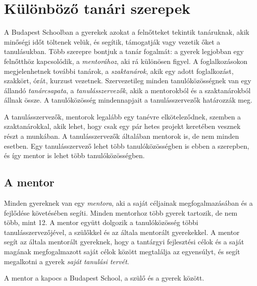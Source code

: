 \hypertarget{kulonbozo-tanari-szerepek}{%
\section{Különböző tanári szerepek}\label{kulonbozo-tanari-szerepek}}

A Budapest Schoolban a gyerekek azokat a felnőtteket tekintik
tanáruknak, akik minőségi időt töltenek velük, és segítik, támogatják
vagy vezetik őket a tanulásukban. Több szerepre bontjuk a tanár
fogalmát: a gyerek legjobban egy felnőtthöz kapcsolódik, a
\emph{mentorához}, aki rá különösen figyel. A foglalkozásokon
megjelenhetnek további tanárok, a \emph{szaktanárok}, akik egy adott
foglalkozást, szakkört, órát, kurzust vezetnek. Szervezetileg minden
tanulóközösségnek van egy állandó \emph{tanárcsapata}, a
\emph{tanulásszervezők}, akik a mentorokból és a szaktanárokból állnak
össze. A tanulóközösség mindennapjait a tanulásszervezők határozzák meg.

A tanulásszervezők, mentorok legalább egy tanévre elköteleződnek,
szemben a szaktanárokkal, akik lehet, hogy csak egy pár hetes projekt
keretében vesznek részt a munkában. A tanulásszervezők általában
mentorok is, de nem minden esetben. Egy tanulásszervező lehet több
tanulóközösségben is ebben a szerepben, és így mentor is lehet több
tanulóközösségben.

\hypertarget{mentor}{%
\subsection{A mentor}\label{mentor}}

Minden gyereknek van egy \emph{mentora}, aki a saját céljainak
megfogalmazásában és a fejlődése követésében segíti. Minden mentorhoz
több gyerek tartozik, de nem több, mint 12. A mentor együtt dolgozik a
tanulóközösség többi tanulásszervezőjével, a szülőkkel és az általa
mentorált gyerekekkel. A mentor segít az általa mentorált gyereknek,
hogy a tantárgyi fejlesztési célok és a saját magának megfogalmazott
saját célok között megtalálja az egyensúlyt, és segít megalkotni a
gyerek \emph{saját tanulási tervét}.

A mentor a kapocs a Budapest School, a szülő és a gyerek között.


